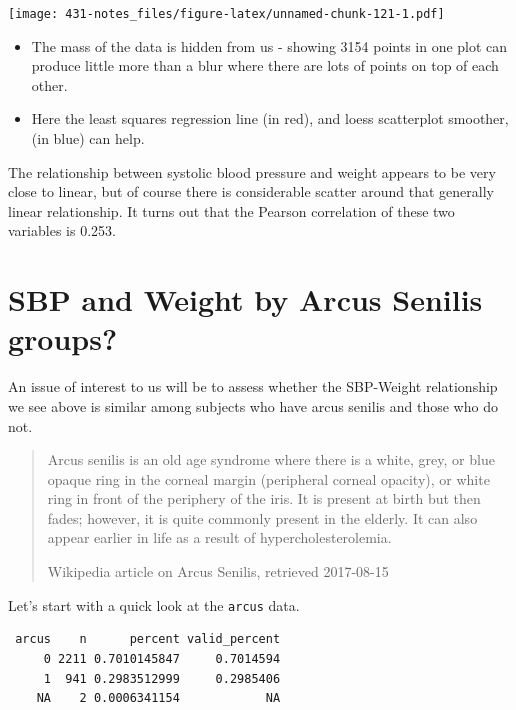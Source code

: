 \documentclass[
]{book}
\newenvironment{Shaded}{\begin{snugshade}}{\end{snugshade}}
\newcommand{\KeywordTok}[1]{\textcolor[rgb]{0.13,0.29,0.53}{\textbf{#1}}}
\newcommand{\NormalTok}[1]{#1}
\newcommand{\OperatorTok}[1]{\textcolor[rgb]{0.81,0.36,0.00}{\textbf{#1}}}
\newcommand{\StringTok}[1]{\textcolor[rgb]{0.31,0.60,0.02}{#1}}
\providecommand{\tightlist}{%
  \setlength{\itemsep}{0pt}\setlength{\parskip}{0pt}}
\begin{document}
\texttt{[image: 431-notes\_files/figure-latex/unnamed-chunk-121-1.pdf]}

\begin{itemize}
\tightlist
\item
  The mass of the data is hidden from us - showing 3154 points in one plot can produce little more than a blur where there are lots of points on top of each other.
\item
  Here the least squares regression line (in red), and loess scatterplot smoother, (in blue) can help.
\end{itemize}

The relationship between systolic blood pressure and weight appears to be very close to linear, but of course there is considerable scatter around that generally linear relationship. It turns out that the Pearson correlation of these two variables is 0.253.

\hypertarget{sbp-and-weight-by-arcus-senilis-groups}{%
\section{SBP and Weight by Arcus Senilis groups?}\label{sbp-and-weight-by-arcus-senilis-groups}}

An issue of interest to us will be to assess whether the SBP-Weight relationship we see above is similar among subjects who have arcus senilis and those who do not.

\begin{quote}
Arcus senilis is an old age syndrome where there is a white, grey, or blue opaque ring in the corneal margin (peripheral corneal opacity), or white ring in front of the periphery of the iris. It is present at birth but then fades; however, it is quite commonly present in the elderly. It can also appear earlier in life as a result of hypercholesterolemia.

Wikipedia article on Arcus Senilis, retrieved 2017-08-15
\end{quote}

Let's start with a quick look at the \texttt{arcus} data.

\begin{Shaded}
\end{Shaded}

\begin{verbatim}
 arcus    n      percent valid_percent
     0 2211 0.7010145847     0.7014594
     1  941 0.2983512999     0.2985406
    NA    2 0.0006341154            NA
\end{verbatim}
\end{document}
